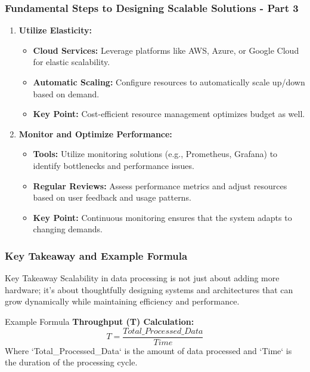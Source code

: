 \documentclass[aspectratio=169]{beamer}
\begin{document}
\begin{frame}[fragile]
    \frametitle{Fundamental Steps to Designing Scalable Solutions - Part 3}
    \begin{enumerate}[resume]
        \item \textbf{Utilize Elasticity:}
            \begin{itemize}
                \item \textbf{Cloud Services:} Leverage platforms like AWS, Azure, or Google Cloud for elastic scalability.
                \item \textbf{Automatic Scaling:} Configure resources to automatically scale up/down based on demand.
                \item \textbf{Key Point:} Cost-efficient resource management optimizes budget as well.
            \end{itemize}

        \item \textbf{Monitor and Optimize Performance:}
            \begin{itemize}
                \item \textbf{Tools:} Utilize monitoring solutions (e.g., Prometheus, Grafana) to identify bottlenecks and performance issues.
                \item \textbf{Regular Reviews:} Assess performance metrics and adjust resources based on user feedback and usage patterns.
                \item \textbf{Key Point:} Continuous monitoring ensures that the system adapts to changing demands.
            \end{itemize}
    \end{enumerate}
\end{frame}

\begin{frame}[fragile]
    \frametitle{Key Takeaway and Example Formula}
    \begin{block}{Key Takeaway}
        Scalability in data processing is not just about adding more hardware; it’s about thoughtfully designing systems and architectures that can grow dynamically while maintaining efficiency and performance.
    \end{block}

    \begin{block}{Example Formula}
        \textbf{Throughput (T) Calculation:}
        \begin{equation}
          T = \frac{Total\_Processed\_Data}{Time}
        \end{equation}
        Where `Total_Processed_Data` is the amount of data processed and `Time` is the duration of the processing cycle.
    \end{block}
\end{frame}
\end{document}

